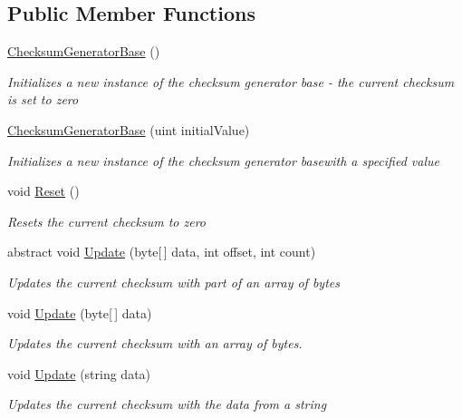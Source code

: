 \subsection*{Public Member Functions}
\begin{DoxyCompactItemize}
\item 
\hyperlink{class_dot_z_lib_1_1_checksum_generator_base_a4c13ec1d2cb08abadffb2c70cb4ba258}{Checksum\+Generator\+Base} ()
\begin{DoxyCompactList}\small\item\em Initializes a new instance of the checksum generator base -\/ the current checksum is set to zero \end{DoxyCompactList}\item 
\hyperlink{class_dot_z_lib_1_1_checksum_generator_base_ab36da84d395361311a45e88797ae8c69}{Checksum\+Generator\+Base} (uint initial\+Value)
\begin{DoxyCompactList}\small\item\em Initializes a new instance of the checksum generator basewith a specified value \end{DoxyCompactList}\item 
void \hyperlink{class_dot_z_lib_1_1_checksum_generator_base_a78ec9de09223c6f9f81e4a32d8d00b70}{Reset} ()
\begin{DoxyCompactList}\small\item\em Resets the current checksum to zero \end{DoxyCompactList}\item 
abstract void \hyperlink{class_dot_z_lib_1_1_checksum_generator_base_a7844da3e1f8af01d7cde34f3056bf24b}{Update} (byte\mbox{[}$\,$\mbox{]} data, int offset, int count)
\begin{DoxyCompactList}\small\item\em Updates the current checksum with part of an array of bytes \end{DoxyCompactList}\item 
void \hyperlink{class_dot_z_lib_1_1_checksum_generator_base_a3fafe3e0c2fa80fb2cbbdce82a76bc84}{Update} (byte\mbox{[}$\,$\mbox{]} data)
\begin{DoxyCompactList}\small\item\em Updates the current checksum with an array of bytes. \end{DoxyCompactList}\item 
void \hyperlink{class_dot_z_lib_1_1_checksum_generator_base_a4f0a5411dbb86714571852000932d66e}{Update} (string data)
\begin{DoxyCompactList}\small\item\em Updates the current checksum with the data from a string \end{DoxyCompactList}\item 

\end{DoxyCompactItemize}
